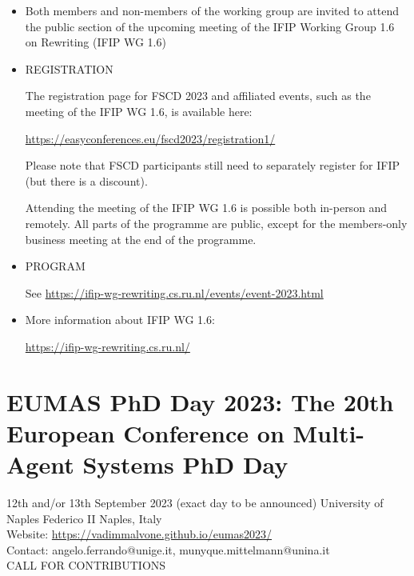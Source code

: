 \documentclass[prodmode,acmtecs]{acmsmall} %
\begin{document}
\begin{itemize}\item  Both members and non-members of the working group are invited to attend the public section of the upcoming meeting of the IFIP Working Group 1.6 on Rewriting (IFIP WG 1.6) 
 
\item  REGISTRATION 
 
  The registration page for FSCD 2023 and affiliated events, such as the meeting of the IFIP WG 1.6, is available here: 
 
  \href{https://easyconferences.eu/fscd2023/registration1/}{https://easyconferences.eu/fscd2023/registration1/} 
 
  Please note that FSCD participants still need to separately register for IFIP (but there is a discount). 
 
  Attending the meeting of the IFIP WG 1.6 is possible both in-person and remotely. All parts of the programme are public, except for the members-only business meeting at the end of the programme. 
 
\item  PROGRAM 
 
  See \href{https://ifip-wg-rewriting.cs.ru.nl/events/event-2023.html}{https://ifip-wg-rewriting.cs.ru.nl/events/event-2023.html} 
 
\item  More information about IFIP WG 1.6: 
 
  \href{https://ifip-wg-rewriting.cs.ru.nl/}{https://ifip-wg-rewriting.cs.ru.nl/} 
 
\end{itemize}\section{EUMAS PhD Day 2023: The 20th European Conference on Multi-Agent Systems PhD Day}\label{EUMASPhDDay2023}  12th and/or 13th September 2023 (exact day to be announced) University of Naples Federico II Naples, Italy\\ 
  Website: \href{https://vadimmalvone.github.io/eumas2023/}{https://vadimmalvone.github.io/eumas2023/} \\ 
  Contact: angelo.ferrando@unige.it, munyque.mittelmann@unina.it\\ 
CALL FOR CONTRIBUTIONS 
\end{document}
